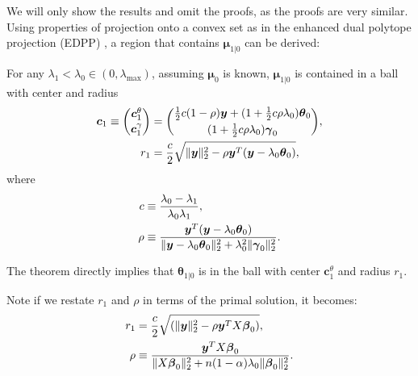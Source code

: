 We will only show the results and omit the proofs, as the proofs are very similar. Using properties of projection onto a convex set as in the enhanced dual polytope projection (EDPP) \citep{wang2013lasso}, a region that contains $\boldsymbol\mu_{1|0}$ can be derived:
\begin{theorem}
    \label{thm:1.1.alt}
    For any $\lambda_1<\lambda_{0}\in (0,\lambda_\textrm{max})$, assuming $\boldsymbol\mu_0$ is known, $\boldsymbol\mu_{1|0}$ is contained in a ball with center and radius
    \begin{gather}
        \begin{aligned}
            \boldsymbol c_1\equiv\binom{\boldsymbol c_1^\theta}{\boldsymbol c_1^\gamma}&=\binom{\frac{1}{2}c(1-\rho)\boldsymbol y+(1+\frac{1}{2}c\rho\lambda_0)\boldsymbol\theta_{0}}{(1+\frac{1}{2}c\rho\lambda_0)\boldsymbol\gamma_{0}},\\
            r_1&=\frac{c}{2}\sqrt{\lVert\boldsymbol y\rVert_2^2-\rho \boldsymbol y^T(\boldsymbol y-\lambda_0\boldsymbol\theta_{0})},
        \end{aligned}
    \end{gather}
    where
    \begin{gather}
        \begin{aligned}
            c&\equiv\frac{\lambda_0-\lambda_1}{\lambda_0\lambda_1},\\
            \rho&\equiv\frac{\boldsymbol y^T(\boldsymbol y-\lambda_0\boldsymbol\theta_{0})}{\lVert\boldsymbol y-\lambda_0\boldsymbol\theta_{0}\rVert_2^2+\lambda_0^2\lVert\boldsymbol\gamma_{0}\rVert_2^2}.\nonumber
        \end{aligned}
    \end{gather}
\end{theorem}
The theorem  directly implies that $\boldsymbol\theta_{1|0}$ is in the ball with center $\boldsymbol c_1^\theta$ and radius $r_1$.

Note if we restate $r_1$ and $\rho$ in terms of the primal solution, it becomes:
\begin{gather}
    \label{eq:thm1prim}
    \begin{aligned}
        r_1&=\frac{c}{2}\sqrt{(\lVert\boldsymbol y\rVert_2^2-\rho \boldsymbol y^TX\boldsymbol\beta_{0})},\\
        \rho&\equiv\frac{\boldsymbol y^TX\boldsymbol\beta_{0}}{\lVert X\boldsymbol\beta_{0}\rVert_2^2+n(1-\alpha)\lambda_0\lVert\boldsymbol\beta_{0}\rVert_2^2}.
    \end{aligned}
\end{gather}

